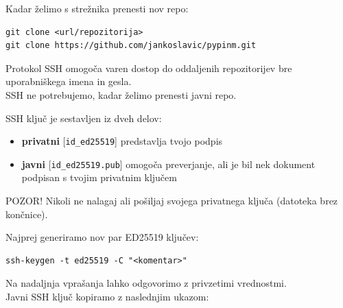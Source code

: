 \documentclass{article}
\begin{document}
\begin{multicols*}{2}
\begin{textbox}[black]
Kadar želimo s strežnika prenesti nov repo:
\end{textbox}

\begin{codebox}[black]
\begin{lstlisting}
git clone <url/repozitorija>
git clone https://github.com/jankoslavic/pypinm.git
\end{lstlisting}
\end{codebox}


\begin{textbox}[black]
Protokol SSH omogoča varen dostop do oddaljenih repozitorijev bre uporabniškega imena in gesla.\\
SSH ne potrebujemo, kadar želimo prenesti javni repo.
\end{textbox}

\begin{infobox}[black]
SSH ključ je sestavljen iz dveh delov:
\begin{itemize}[leftmargin=10pt]
    \item \textbf{privatni} [\lstinline{id_ed25519}] predstavlja tvojo podpis
    \item \textbf{javni} [\lstinline{id_ed25519.pub}] omogoča preverjanje, ali je bil nek dokument podpisan s tvojim privatnim ključem
\end{itemize}
\end{infobox}

\begin{warnbox}[black]
POZOR! Nikoli ne nalagaj ali pošiljaj svojega privatnega ključa (datoteka brez končnice).
\end{warnbox}

\begin{textbox}[black]
Najprej generiramo nov par ED25519 ključev:
\end{textbox}

\begin{codebox}[black]
\begin{lstlisting}
ssh-keygen -t ed25519 -C "<komentar>"
\end{lstlisting}
\end{codebox}

\begin{textbox}[black]
Na nadaljnja vprašanja lahko odgovorimo z privzetimi vrednostmi.\\
Javni SSH ključ kopiramo z naslednjim ukazom:
\end{textbox}


\end{multicols*}
\end{document}

